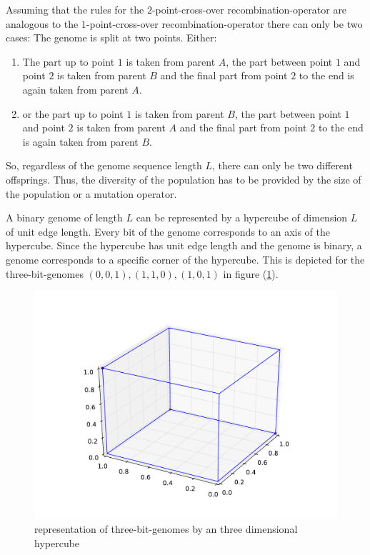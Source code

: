 \documentclass[10pt,a4paper,boxed]{hmcpset}
\begin{document}
\begin{problem}[Assignment 44]
\end{problem}
\begin{solution}
Assuming that the rules for the $2$-point-cross-over recombination-operator are analogous to the $1$-point-cross-over recombination-operator there can only be two cases:
The genome is split at two points. Either:
\begin{enumerate}
	\item The part up to point $1$ is taken from parent $A$, the part between point $1$ and point $2$ is taken from parent $B$ and the final part from point $2$ to the end is again taken from parent $A$.
	\item or the part up to point $1$ is taken from parent $B$, the part between point $1$ and point $2$ is taken from parent $A$ and the final part from point $2$ to the end is again taken from parent $B$.
\end{enumerate}
So, regardless of the genome sequence length $L$, there can only be two different offsprings. Thus, the diversity of the population has to be provided by the size of the population or a mutation operator.

\end{solution}

\begin{problem}[Assignment 45]
\end{problem}
\begin{solution}
A binary genome of length $L$ can be represented by a hypercube of dimension $L$ of unit edge length. Every bit of the genome corresponds to an axis of the hypercube. Since the hypercube has unit edge length and the genome is binary, a genome corresponds to a specific corner of the hypercube. This is depicted for the three-bit-genomes $(0,0,1), (1,1,0), (1,0,1)$ in figure (\ref{fig:hypercube}).

\begin{figure}[h!]
	\includegraphics[width=\textwidth]{img/cube}
\caption{representation of three-bit-genomes by an three dimensional hypercube}
\label{fig:hypercube}
\end{figure}
\end{solution}
\end{document}
